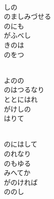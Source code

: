 \documentclass[10pt,b5j]{tarticle} %
\begin{document}
\vspace{1.5em} %
\newcommand{\linespace}{0.5em} %
\newcommand{\blocksize}{0.5\hsize} %
\newcommand{\itemmargin}{3em} %
\begin{enumerate} %
    \setlength{\itemindent}{\itemmargin} %
    \begin{minipage}[c]{\blocksize}
    
        \vspace{\linespace}
        \item~\\
        しの\\
        のましみづせる\\
        のにも\\
        がふべし\\
        きのは\\
        のをつ
        
    \end{minipage}
    \begin{minipage}[c]{\blocksize}
        
        \vspace{\linespace}
        \item~\\
        よのの\\
        のはつるなり\\
        ととにはれ\\
        がけしの\\
        はりて
        
    \end{minipage}
    \begin{minipage}[c]{\blocksize}
        
        \vspace{\linespace}
        \item~\\
        のにはして\\
        のれなり\\
        のもゆる\\
        みへてか\\
        がのければ\\
        ののし
        

\end{minipage}
\end{enumerate}
\end{document}
